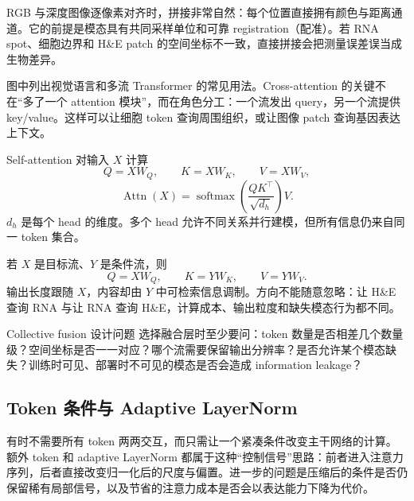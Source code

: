 RGB 与深度图像逐像素对齐时，拼接非常自然：每个位置直接拥有颜色与距离通道。它的前提是模态具有共同采样单位和可靠 registration（配准）。若 RNA spot、细胞边界和 H\&E patch 的空间坐标不一致，直接拼接会把测量误差误当成生物差异。


图中列出视觉语言和多流 Transformer 的常见用法。Cross-attention 的关键不在“多了一个 attention 模块”，而在角色分工：一个流发出 query，另一个流提供 key/value。这样可以让细胞 token 查询周围组织，或让图像 patch 查询基因表达上下文。


Self-attention 对输入 $X$ 计算
\[
Q=XW_Q,\qquad K=XW_K,\qquad V=XW_V,
\]
\[
\operatorname{Attn}(X)=\operatorname{softmax}\!\left(\frac{QK^\top}{\sqrt{d_h}}\right)V.
\]
$d_h$ 是每个 head 的维度。多个 head 允许不同关系并行建模，但所有信息仍来自同一 token 集合。


若 $X$ 是目标流、$Y$ 是条件流，则
\[
Q=XW_Q,\qquad K=YW_K,\qquad V=YW_V.
\]
输出长度跟随 $X$，内容却由 $Y$ 中可检索信息调制。方向不能随意忽略：让 H\&E 查询 RNA 与让 RNA 查询 H\&E，计算成本、输出粒度和缺失模态行为都不同。

\begin{knowledgebox}{Collective fusion 设计问题}
选择融合层时至少要问：token 数量是否相差几个数量级？空间坐标是否一一对应？哪个流需要保留输出分辨率？是否允许某个模态缺失？训练时可见、部署时不可见的模态是否会造成 information leakage？
\end{knowledgebox}

\subsection{Token 条件与 Adaptive LayerNorm}

有时不需要所有 token 两两交互，而只需让一个紧凑条件改变主干网络的计算。额外 token 和 adaptive LayerNorm 都属于这种“控制信号”思路：前者进入注意力序列，后者直接改变归一化后的尺度与偏置。进一步的问题是压缩后的条件是否仍保留稀有局部信号，以及节省的注意力成本是否会以表达能力下降为代价。


